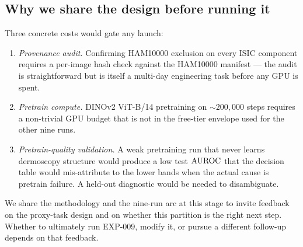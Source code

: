 \subsection{Why we share the design before running it}
Three concrete costs would gate any launch:
\begin{enumerate}[label=(\arabic*), leftmargin=2em]
\item \emph{Provenance audit.} Confirming HAM10000 exclusion on every
      ISIC component requires a per-image hash check against the
      HAM10000 manifest --- the audit is straightforward but is itself
      a multi-day engineering task before any GPU is spent.
\item \emph{Pretrain compute.} DINOv2 ViT-B/14 pretraining on
      $\sim$$200{,}000$ steps requires a non-trivial GPU budget that is
      not in the free-tier envelope used for the other nine runs.
\item \emph{Pretrain-quality validation.} A weak pretraining run that
      never learns dermoscopy structure would produce a low test
      $\mathrm{AUROC}$ that the decision table would mis-attribute to the
      lower bands when the actual cause is pretrain failure. A held-out
      diagnostic would be needed to disambiguate.
\end{enumerate}
We share the methodology and the nine-run arc at this stage to invite
feedback on the proxy-task design and on whether this partition is the
right next step. Whether to ultimately run EXP-009, modify it, or
pursue a different follow-up depends on that feedback.
